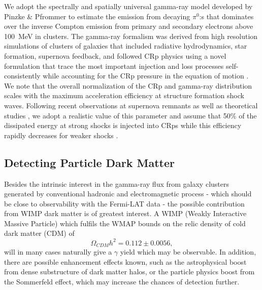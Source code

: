 \documentclass[10pt,aps,pra,reprint,amsmath,amsfonts,amssymb,showpacs]{revtex4-1}
\begin{document}
We adopt the spectrally and spatially universal gamma-ray model
developed by Pinzke \& Pfrommer \cite{2010MNRAS.409..449P} to estimate
the emission from decaying $\pi^0$:s that dominates over the inverse
Compton emission from primary and secondary electrons above 100~MeV in
clusters. The gamma-ray formalism was derived from high resolution
simulations of clusters of galaxies that included radiative
hydrodynamics, star formation, supernova feedback, and followed CRp
physics using a novel formulation that trace the most important
injection and loss processes self-consistently while accounting for
the CRp pressure in the equation of motion
\cite{2008A&A...481...33J,2007A&A...473...41E,2006MNRAS.367..113P}.
We note that the overall normalization of the CRp and gamma-ray
distribution scales with the maximum acceleration efficiency at
structure formation shock waves. Following recent observations at
supernova remnants \cite{2009Sci...325..719H} as well as theoretical
studies \cite{2005ApJ...620...44K}, we adopt a realistic value of this
parameter and assume that 50\% of the dissipated energy at strong
shocks is injected into CRps while this efficiency rapidly decreases
for weaker shocks \cite{2007A&A...473...41E}.
 

\subsection{Detecting Particle Dark Matter}
\label{sect:PF}
Besides the intrinsic interest in the gamma-ray flux from galaxy
clusters generated by conventional hadronic and electromagnetic
process - which should be close to observability with the Fermi-LAT
data \cite{Berezinsky:1996wx,2007A&A...473...41E,2010MNRAS.409..449P}
- the possible contribution from WIMP dark matter is of greatest
interest. A WIMP (Weakly Interactive Massive Particle) which fulfils
the WMAP bounds on the relic density of cold dark matter (CDM) of
\cite{Komatsu:2010fb}
$$\Omega_{CDM}h^2=0.112\pm 0.0056,$$ will in many cases naturally give
a $\gamma$ yield which may be observable. In addition, there are
possible enhancement effects known, such as the astrophysical boost
from dense substructure of dark matter halos, or the particle physics
boost from the Sommerfeld effect, which may increase the chances of
detection further.
\end{document}
